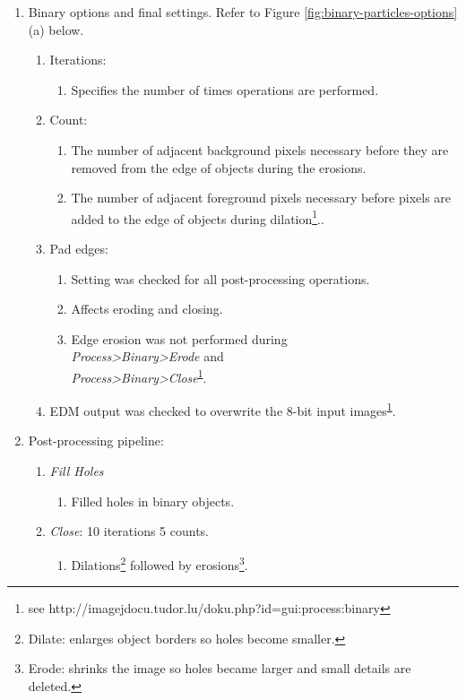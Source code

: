 \begin{enumerate}
\item Binary options and final settings. Refer to Figure  \ref{fig:binary-particles-options} (a) below.
	\begin{enumerate}
	\item Iterations: 
		\begin{enumerate}
		\item Specifies the number of times operations are performed.
		\end{enumerate}
	\item Count:
		\begin{enumerate}
		\item The number of adjacent background pixels necessary before they are removed from the edge of objects during the erosions.
		\item The number of adjacent foreground pixels necessary before pixels are added to the edge of objects during dilation\footnote{\label{note1}see http://imagejdocu.tudor.lu/doku.php?id=gui:process:binary}..
		\end{enumerate}
	\item Pad edges:
		\begin{enumerate}
		\item Setting was checked for all post-processing operations.
		\item Affects eroding and closing.
		\item Edge erosion was not performed during\\ \emph{Process>Binary>Erode} and\\ \emph{Process>Binary>Close}\textsuperscript{\ref{note1}}.
		\end{enumerate}
	\item EDM output was checked to overwrite the 8-bit input images\textsuperscript{\ref{note1}}.
	\end{enumerate}
\item Post-processing pipeline:
	\begin{enumerate}
		\item \emph{Fill Holes}
			\begin{enumerate}
			\item Filled holes in binary objects.
			\end{enumerate}
		\item \emph{Close}: 10 iterations 5 counts. 
			\begin{enumerate}
			\item Dilations\footnote{Dilate: enlarges object borders so holes become smaller.} followed by erosions\footnote{Erode: shrinks the image so holes became larger and small details are deleted.}. 

\end{enumerate}
\end{enumerate}
\end{enumerate}
